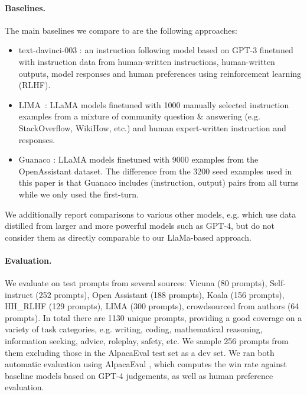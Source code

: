 \vspace{-2mm}

\paragraph{Baselines.} The main baselines we compare to are the following  approaches: 
\vspace{-2mm}
\begin{itemize}[leftmargin=*]
    \item text-davinci-003 \citep{ouyang2022training}: an instruction following model based on GPT-3 finetuned with instruction data from human-written instructions, human-written outputs, model responses and human preferences using reinforcement learning (RLHF).
    \item LIMA~\citep{zhou2023lima}: LLaMA models finetuned with 1000 manually selected instruction examples from a mixture of community question \& answering (e.g. StackOverflow, WikiHow, etc.) and human expert-written instruction and responses. 
    \item Guanaco \citep{dettmers2023qlora}: LLaMA models finetuned with 9000 examples from the OpenAssistant dataset. The difference from the 3200 seed examples used in this paper is that Guanaco includes (instruction, output) pairs from all turns while we only used the first-turn.
\end{itemize}

We additionally report comparisons to various other models, e.g. which use data distilled from larger and more powerful models such as GPT-4, but do not consider them as directly comparable to our LlaMa-based approach.

\paragraph{Evaluation.} We evaluate on test prompts from several sources: Vicuna \citep{vicuna2023} (80 prompts), Self-instruct \citep{zhang2023self} (252 prompts), Open Assistant \citep{kopf2023openassistant} (188 prompts), Koala \citep{koala_blogpost_2023} (156 prompts), HH\_RLHF \citep{bai2022training} (129 prompts), LIMA \citep{zhou2023lima} (300 prompts), crowdsourced from authors (64 prompts). In total there are 1130 unique prompts, providing a good coverage on a variety of task categories, e.g. writing, coding, mathematical reasoning, information seeking, advice, roleplay, safety, etc. We sample 256 prompts from them excluding those in the AlpacaEval test set as a dev set. We ran both automatic evaluation using AlpacaEval \citep{alpaca_eval}, which computes the win rate against baseline models based on GPT-4 judgements, as well as human preference evaluation. 

